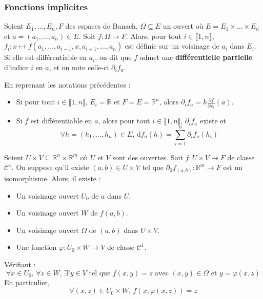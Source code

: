 	\subsubsection{Fonctions implicites}


	\begin{definition}
		Soient $E_1, \dots, E_n, F$ des espaces de Banach, $\Omega \subseteq E$ un ouvert où $E = E_1 \times \dots \times E_n$ et $a = (a_1, \dots, a_n) \in E$. Soit $f : \Omega \rightarrow F$. Alors, pour tout $i \in \llbracket 1, n \rrbracket$, $f_i : x \mapsto f(a_1, \dots, a_{i-1}, x, a_{i+1}, \dots, a_n)$ est définie sur un voisinage de $a_i$ dans $E_i$. Si elle est différentiable en $a_i$, on dit que $f$ admet une \textbf{différentielle partielle} d'indice $i$ en $a$, et on note celle-ci $\partial_i f_a$.
	\end{definition}

	\begin{remark}
		En reprenant les notations précédentes :
		\begin{itemize}
			\item Si pour tout $i \in \llbracket 1, n \rrbracket$, $E_i = \mathbb{R}$ et $F = E = \mathbb{R}^n$, alors $\partial_i f_a = h \frac{\partial f}{\partial x_i} (a)$.
			\item Si $f$ est différentiable en $a$, alors pour tout $i \in \llbracket 1, n \rrbracket$, $\partial_i f_a$ existe et
			\[ \forall h = (h_1, \dots, h_n) \in E, \, \mathrm{d}f_a(h) = \sum_{i=1}^{n} \partial_i f_a(h_i) \]
		\end{itemize}
	\end{remark}

	\begin{theorem}
		Soient $U \times V \subseteq \mathbb{R}^n \times \mathbb{R}^m$ où $U$ et $V$ sont des ouvertes. Soit $f : U \times V \rightarrow F$ de classe $\mathcal{C}^1$. On suppose qu'il existe $(a,b) \in U \times V$ tel que $\partial_2 f_{(a,b)} : \mathbb{R}^m \rightarrow F$ est un isomorphisme. Alors, il existe :
		\begin{itemize}
			\item Un voisinage ouvert $U_0$ de $a$ dans $U$.
			\item Un voisinage ouvert $W$ de $f(a,b)$.
			\item Un voisinage ouvert $\Omega$ de $(a,b)$ dans $U \times V$.
			\item Une fonction $\varphi : U_0 \times W \rightarrow V$ de classe $\mathcal{C}^1$.
		\end{itemize}
		Vérifiant :
		\[ \forall x \in U_0, \, \forall z \in W, \, \exists! y \in V \text{ tel que } f(x,y)=z \text{ avec } (x, y) \in \Omega \text{ et } y=\varphi(x,z) \]
		En particulier,
		\[ \forall (x,z) \in U_0 \times W, \, f(x, \varphi(x,z)) = z \]
	\end{theorem}


